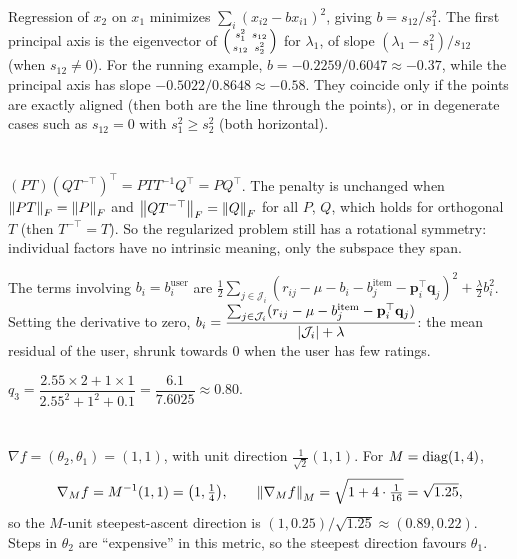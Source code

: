 Regression of $x_2$ on $x_1$ minimizes $\sum_i(x_{i2} - bx_{i1})^2$, giving $b = s_{12}/s_1^2$. The first principal axis is
the eigenvector of $\begin{psmallmatrix}s_1^2 & s_{12}\\ s_{12} & s_2^2\end{psmallmatrix}$ for $\lambda_1$, of slope $(\lambda_1 - s_1^2)/s_{12}$
(when $s_{12}\neq0$). For the running example, $b = -0.2259/0.6047\approx-0.37$, while the principal axis has
slope $-0.5022/0.8648\approx-0.58$. They coincide only if the points are exactly aligned (then both are the line
through the points), or in degenerate cases such as $s_{12} = 0$ with $s_1^2\geq s_2^2$ (both horizontal).

\section{}

$(PT)(QT^{-\top})^\top = PTT^{-1}Q^\top = PQ^\top$. The penalty is unchanged when $\left\|PT\right\|_F = \left\|P\right\|_F$ and
$\left\|QT^{-\top}\right\|_F = \left\|Q\right\|_F$ for all $P$, $Q$, which holds for orthogonal $T$ (then $T^{-\top} = T$). So the
regularized problem still has a rotational symmetry: individual factors have no intrinsic meaning,
only the subspace they span.

The terms involving $b_i = b_i^{\text{user}}$ are $\frac12\sum_{j\in\mathcal J_i}(r_{ij} - \mu - b_i - b_j^{\text{item}} - \mathbf p_i^\top\mathbf q_j)^2 + \frac\lambda2b_i^2$.
Setting the derivative to zero,
$b_i = \dfrac{\sum_{j\in\mathcal J_i}(r_{ij} - \mu - b_j^{\text{item}} - \mathbf p_i^\top\mathbf q_j)}{\left|\mathcal J_i\right| + \lambda}$: the mean residual
of the user, shrunk towards $0$ when the user has few ratings.

$q_3 = \dfrac{2.55\times2 + 1\times1}{2.55^2 + 1^2 + 0.1} = \dfrac{6.1}{7.6025}\approx0.80$.

\section{}

$\nabla f = (\theta_2, \theta_1) = (1,1)$, with unit direction $\frac1{\sqrt2}(1,1)$. For $M = \operatorname{diag}(1,4)$,
\[
  \nabla_Mf = M^{-1}(1,1) = \bigl(1, \tfrac14\bigr),\qquad\left\|\nabla_Mf\right\|_M = \sqrt{1 + 4\cdot\tfrac1{16}} = \sqrt{1.25},
\]
so the $M$-unit
steepest-ascent direction is $(1, 0.25)/\sqrt{1.25}\approx(0.89, 0.22)$. Steps in $\theta_2$ are ``expensive'' in this
metric, so the steepest direction favours $\theta_1$.

